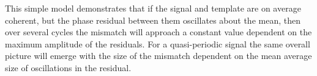 \documentclass[../full_thesis/full_thesis.tex]{subfiles}
\begin{document}
This simple model demonstrates that if the signal and template are on average
coherent, but the phase residual between them oscillates about the mean, then
over several cycles the mismatch will approach a constant value dependent on
the maximum amplitude of the residuals.  For a quasi-periodic signal the same
overall picture will emerge with the size of the mismatch dependent on the mean
average size of oscillations in the residual.

\biblio
\end{document}
